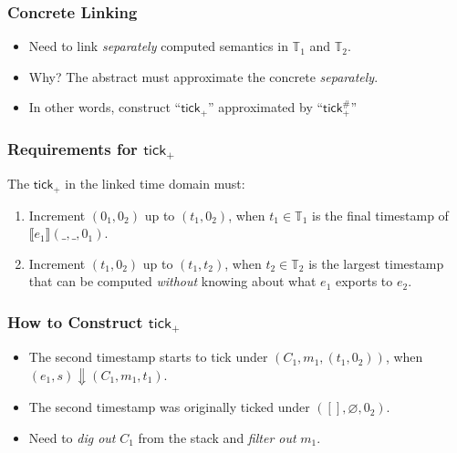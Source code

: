 \documentclass{beamer}
\newcommand*{\A}[1]{{#1}^{\#}}
\newcommand*{\Time}{\mathbb{T}}
\newcommand*{\mem}{m}
\newcommand*{\sembracket}[1]{\lBrack{#1}\rBrack}
\newcommand*{\tick}{\mathsf{tick}}
\begin{document}
\begin{frame}[c]
  \frametitle{Concrete Linking}
  \begin{itemize}
    \item Need to link \emph{separately} computed semantics in $\Time_1$ and $\Time_2$.
    \item Why? The abstract must approximate the concrete \emph{separately}.
    \item In other words, construct ``$\tick_+$'' approximated by ``$\A\tick_+$''
  \end{itemize}
\end{frame}
\begin{frame}[c]
  \frametitle{Requirements for $\tick_+$}
  The $\tick_+$ in the linked time domain must:
  \begin{enumerate}
    \item Increment $(0_1,0_2)$ up to $(t_1,0_2)$, when $t_1\in\Time_1$ is the final timestamp of $\sembracket{e_1}(\_,\_,0_1)$.
    \item Increment $(t_1,0_2)$ up to $(t_1,t_2)$, when $t_2\in\Time_2$ is the largest timestamp that can be computed \emph{without} knowing about what $e_1$ exports to $e_2$.
  \end{enumerate}
\end{frame}

\begin{frame}[c]
  \frametitle{How to Construct $\tick_+$}
  \begin{itemize}
    \item The second timestamp starts to tick under $(C_1,\mem_1,(t_1,0_2))$, when $(e_1,s)\Downarrow(C_1,\mem_1,t_1)$.
    \item The second timestamp was originally ticked under $([],\varnothing,0_2)$.
    \item Need to \emph{dig out} $C_1$ from the stack and \emph{filter out} $\mem_1$.
  \end{itemize}
\end{frame}
\end{document}
